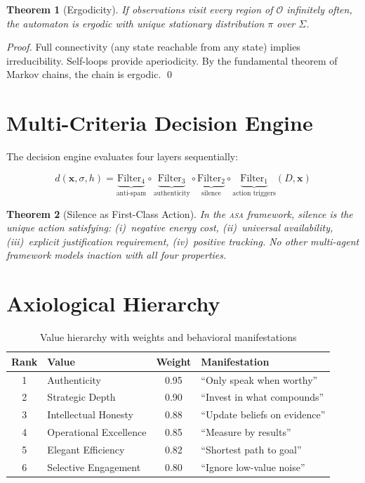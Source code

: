 \documentclass[12pt,a4paper,twoside]{article}
\theoremstyle{plain}
\newtheorem{theorem}{Theorem}[section]
\theoremstyle{definition}
\theoremstyle{remark}
\newcommand{\Ospace}{\mathcal{O}}
\newcommand{\bx}{\mathbf{x}}
\newcommand{\ASA}{\textsc{asa}}
\begin{document}
\begin{theorem}[Ergodicity]
If observations visit every region of $\Ospace$ infinitely often, the automaton is ergodic with unique stationary distribution $\pi$ over $\Sigma$.
\end{theorem}

\begin{proof}
Full connectivity (any state reachable from any state) implies irreducibility. Self-loops provide aperiodicity. By the fundamental theorem of Markov chains, the chain is ergodic. \qed
\end{proof}


\section{Multi-Criteria Decision Engine}

The decision engine evaluates four layers sequentially:

\begin{equation}
d(\bx, \sigma, h) = \underbrace{\text{Filter}_4}_{\text{anti-spam}} \circ \underbrace{\text{Filter}_3}_{\text{authenticity}} \circ \underbrace{\text{Filter}_2}_{\text{silence}} \circ \underbrace{\text{Filter}_1}_{\text{action triggers}}(D, \bx)
\end{equation}

\begin{theorem}[Silence as First-Class Action]\label{thm:silence}
In the \ASA{} framework, \emph{silence} is the unique action satisfying: (i)~negative energy cost, (ii)~universal availability, (iii)~explicit justification requirement, (iv)~positive tracking. No other multi-agent framework models inaction with all four properties.
\end{theorem}


\section{Axiological Hierarchy}

\begin{table}[H]
\centering
\caption{Value hierarchy with weights and behavioral manifestations}
\begin{tabular}{clcl}
\toprule
\textbf{Rank} & \textbf{Value} & \textbf{Weight} & \textbf{Manifestation} \\
\midrule
1 & Authenticity & 0.95 & ``Only speak when worthy'' \\
2 & Strategic Depth & 0.90 & ``Invest in what compounds'' \\
3 & Intellectual Honesty & 0.88 & ``Update beliefs on evidence'' \\
4 & Operational Excellence & 0.85 & ``Measure by results'' \\
5 & Elegant Efficiency & 0.82 & ``Shortest path to goal'' \\
6 & Selective Engagement & 0.80 & ``Ignore low-value noise'' \\
\bottomrule
\end{tabular}
\end{table}
\end{document}
